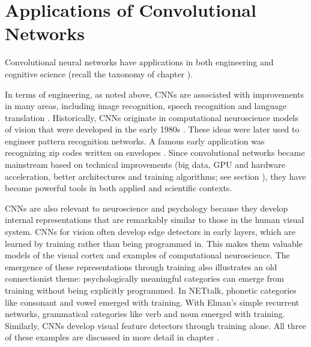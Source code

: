 \section{Applications of Convolutional Networks}\label{cnn_applications}

Convolutional neural networks have applications in both engineering and cognitive science (recall the taxonomy of chapter ).

In terms of engineering, as noted above, CNNs are associated with improvements in many areas, including image recognition, speech recognition and language translation \cite{lecun2015deep, goodfellow2016deep}. Historically, CNNs originate in computational neuroscience models of vision that were developed in the early 1980s \cite{fukushima1982neocognitron}. These ideas were later used to engineer pattern recognition networks. A famous early application was recognizing zip codes written on envelopes \cite{lecun1989backpropagation}. Since convolutional networks became mainstream based on technical improvements (big data, GPU and hardware acceleration, better architectures and training algorithms; see section ), they have become powerful tools in both applied and scientific contexts.

CNNs are also relevant to neuroscience and psychology because they develop internal representations that are remarkably similar to those in the human visual system. CNNs for vision often develop edge detectors in early layers, which are learned by training rather than being programmed in. This makes them valuable models of the visual cortex and examples of computational neuroscience. The emergence of these representations through training also illustrates an old connectionist theme: psychologically meaningful categories can emerge from training without being explicitly programmed. In NETtalk, phonetic categories like consonant and vowel emerged with training. With Elman's simple recurrent networks, grammatical categories like verb and noun emerged with training. Similarly, CNNs develop visual feature detectors through training alone. All three of these examples are discussed in more detail in chapter .

